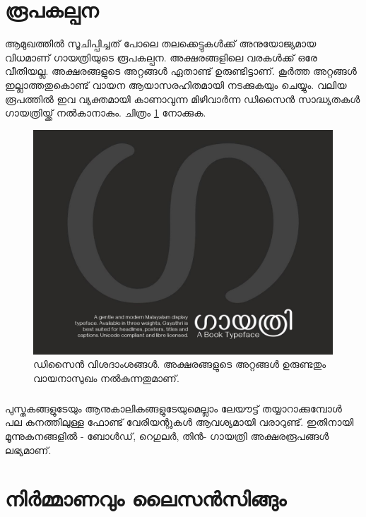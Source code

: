 \documentclass[a4paper, 12pt]{report}
\begin{document}
	
	\chapter*{രൂപകല്പന}
	
	ആമുഖത്തില്‍ സൂചിപ്പിച്ചത് പോലെ തലക്കെട്ടുകള്‍ക്ക് അനുയോജ്യമായ വിധമാണ് ഗായത്രിയുടെ രൂപകല്പന‍. അക്ഷരങ്ങളിലെ വരകൾക്ക് ഒരേ വീതിയല്ല. അക്ഷരങ്ങളുടെ അറ്റങ്ങള്‍ ഏതാണ്ട് ഉരുണ്ടിട്ടാണ്. കൂർത്ത അറ്റങ്ങൾ ഇല്ലാത്തതുകൊണ്ട് വായന ആയാസരഹിതമായി നടക്കുകയും ചെയ്യും.  വലിയ രൂപത്തില്‍ ഇവ വ്യക്തമായി കാണാവുന്ന മിഴിവാര്‍ന്ന ഡിസൈന്‍ സാദ്ധ്യതകള്‍ ഗായത്രിയ്ക്ക് നല്‍കാനാകും.  ചിത്രം \ref{one} നോക്കുക.
	
	\begin{figure}
		\begin{centering}
			\includegraphics[width=1.0\textwidth]{ga.jpg}
			\caption{ഡിസൈന്‍ വിശദാംശങ്ങള്‍. അക്ഷരങ്ങളുടെ അറ്റങ്ങൾ ഉരുണ്ടതും വായനാസുഖം നൽകുന്നതുമാണ്.}
			\label{one}
		\end{centering}
	\end{figure}
	
	\paragraph{}
	പുസ്തകങ്ങളുടേയും ആനുകാലികങ്ങളുടേയുമെല്ലാം ലേയൗട്ട് തയ്യാറാക്കുമ്പോള്‍ പല കനത്തിലുള്ള ഫോണ്ട് വേരിയന്റുകള്‍ ആവശ്യമായി വരാറുണ്ട്. ഇതിനായി മൂന്നുകനങ്ങളില്‍ - ബോള്‍ഡ്, റെഗുലര്‍, തിന്‍- ഗായത്രി അക്ഷരരൂപങ്ങള്‍ ലഭ്യമാണ്. 
	
	\chapter*{നിര്‍മ്മാണവും ലൈസന്‍സിങ്ങും}
	
\end{document}
